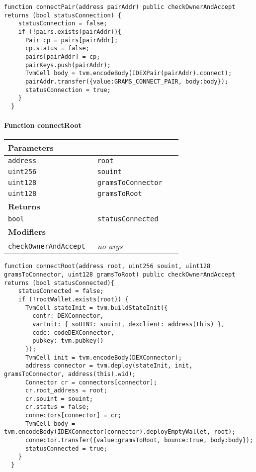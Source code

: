 \vspace{2cm}

\begin{lstlisting}[firstnumber=92]
  function connectPair(address pairAddr) public checkOwnerAndAccept  returns (bool statusConnection) {
    statusConnection = false;
    if (!pairs.exists(pairAddr)){
      Pair cp = pairs[pairAddr];
      cp.status = false;
      pairs[pairAddr] = cp;
      pairKeys.push(pairAddr);
      TvmCell body = tvm.encodeBody(IDEXPair(pairAddr).connect);
      pairAddr.transfer({value:GRAMS_CONNECT_PAIR, body:body});
      statusConnection = true;
    }
  }
\end{lstlisting}

\paragraph{Function connectRoot}


\ifsoltables
\noindent\begin{tabular}{|l|l|p{5cm}|}\hline
\multicolumn{3}{|l|}{\bf Parameters}\\\hline
\tt address & \tt root &\\\hline
\tt uint256 & \tt souint &\\\hline
\tt uint128 & \tt gramsToConnector &\\\hline
\tt uint128 & \tt gramsToRoot &\\\hline
\multicolumn{3}{|l|}{\bf Returns}\\\hline
\tt bool & \tt statusConnected &\\\hline
\multicolumn{3}{|l|}{\bf Modifiers}\\\hline
\tt checkOwnerAndAccept & {\em no args} &\\\hline
\end{tabular}
\fi

\vspace{2cm}

\begin{lstlisting}[firstnumber=158]
  function connectRoot(address root, uint256 souint, uint128 gramsToConnector, uint128 gramsToRoot) public checkOwnerAndAccept returns (bool statusConnected){
    statusConnected = false;
    if (!rootWallet.exists(root)) {
      TvmCell stateInit = tvm.buildStateInit({
        contr: DEXConnector,
        varInit: { soUINT: souint, dexclient: address(this) },
        code: codeDEXConnector,
        pubkey: tvm.pubkey()
      });
      TvmCell init = tvm.encodeBody(DEXConnector);
      address connector = tvm.deploy(stateInit, init, gramsToConnector, address(this).wid);
      Connector cr = connectors[connector];
      cr.root_address = root;
      cr.souint = souint;
      cr.status = false;
      connectors[connector] = cr;
      TvmCell body = tvm.encodeBody(IDEXConnector(connector).deployEmptyWallet, root);
      connector.transfer({value:gramsToRoot, bounce:true, body:body});
      statusConnected = true;
    }
  }
\end{lstlisting}

